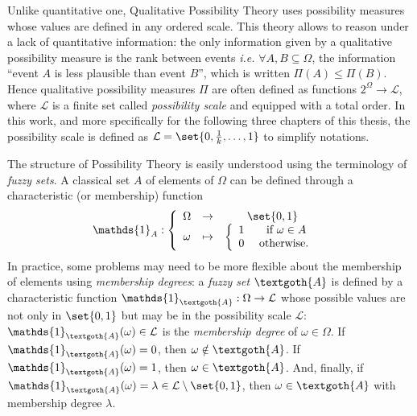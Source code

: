 Unlike quantitative one, Qualitative Possibility Theory 
uses possibility measures whose values are defined in any ordered scale.
This theory allows to reason under a lack of quantitative information:
the only information given by a qualitative possibility measure 
is the rank between events \textit{i.e.} $\forall A,B \subseteq \Omega$, 
the information ``event $A$ is less plausible than event $B$'', 
which is written $\Pi(A) \leqslant \Pi(B)$.
Hence qualitative possibility measures $\Pi$ are often defined
as functions $2^{\Omega} \rightarrow \mathcal{L}$,
where $\mathcal{L}$ is a finite set
called \textit{possibility scale} 
and equipped with a total order. 
In this work, and more specifically 
for the following three chapters of this thesis, 
the possibility scale is defined as $\mathcal{L} = \set{ 0, \frac{1}{k}, \ldots, 1 }$
to simplify notations.

The structure of Possibility Theory is easily understood 
using the terminology of \textit{fuzzy sets}.
A classical set $A$ of elements of $\Omega$ can be defined through
a characteristic (or membership) function \[ \mathds{1}_{A}: \left \{ \begin{array}{ccc} \Omega & \rightarrow & \set{0,1} \\ \omega & \mapsto & \left \{ \begin{array}{ccc} 1 & \mbox{ if } \omega \in A \\ 0 & \mbox{ otherwise. } \end{array} \right. \end{array} \right. \]
In practice, some problems
may need to be more flexible 
about the membership of elements using \textit{membership degrees}:
a \textit{fuzzy set} $\textgoth{A}$
is defined by a characteristic function $\mathds{1}_{\textgoth{A}}: \Omega \rightarrow \mathcal{L}$
whose possible values are not only in $\set{0,1}$ 
but may be in the possibility scale $\mathcal{L}$: 
$\mathds{1}_{\textgoth{A}}(\omega) \in \mathcal{L}$ 
is the \textit{membership degree} of $\omega \in \Omega$.
If $\mathds{1}_{\textgoth{A}}(\omega) = 0$, then $\omega \notin \textgoth{A}$.
If $\mathds{1}_{\textgoth{A}}(\omega) = 1$, then $\omega \in \textgoth{A}$.
And, finally, if $\mathds{1}_{\textgoth{A}}(\omega) = \lambda \in \mathcal{L} \setminus \set{0,1}$,
then $\omega \in \textgoth{A}$ with membership degree $\lambda$.

